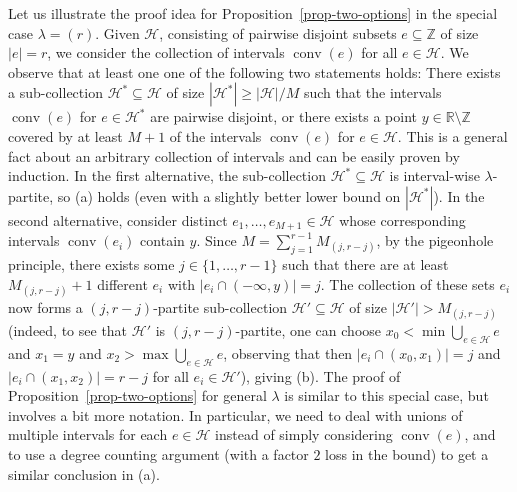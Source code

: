 \documentclass{aic}
\theoremstyle{definition}
\numberwithin{equation}{section}
\numberwithin{figure}{section}
\newcommand{\su}{\subseteq}
\newcommand{\Z}{\mathbb{Z}}
\newcommand{\HH}{\mathcal{H}}
\newcommand{\conv}{\operatorname{conv}}
\begin{document}
Let us illustrate the proof idea for Proposition~\ref{prop-two-options} in the special case $\lambda = (r)$. Given $\HH$, consisting of pairwise disjoint subsets $e\su \Z$ of size $|e|=r$, we consider the collection of intervals $\conv(e)$ for all $e \in \HH$. We observe that at least one one of the following two statements holds: There exists a sub-collection $\HH^*\su \HH$ of size $|\HH^*|\ge |\HH|/M$ such that the intervals $\conv(e)$ for $e\in \HH^*$ are pairwise disjoint, or there exists a point $y \in \mathbb R\setminus \Z$ covered by at least $M+1$ of the intervals $\conv(e)$ for $e\in \HH$. This is a general fact about an arbitrary collection of intervals and can be easily proven by induction. In the first alternative, the sub-collection $\HH^*\su \HH$ is interval-wise $\lambda$-partite, so (a) holds (even with a slightly better lower bound on $|\HH^*|$). In the second alternative, consider distinct $e_1, \ldots, e_{M+1}\in \HH$ whose corresponding intervals $\conv(e_i)$ contain $y$. Since $M = \sum_{j=1}^{r-1} M_{(j, r-j)}$, by the pigeonhole principle, there exists some $j \in \{1, \ldots, r-1\}$ such that there are at least $M_{(j, r-j)}+1$ different $e_i$ with $|e_i \cap (-\infty, y)| = j$. The collection of these sets $e_i$ now forms a $(j, r-j)$-partite sub-collection $\HH'\su \HH$ of size $|\HH'|>M_{(j, r-j)}$ (indeed, to see that $\HH'$ is $(j, r-j)$-partite, one can choose $x_0<\min \bigcup_{e\in \HH} e$ and $x_1=y$ and $x_2>\max \bigcup_{e\in \HH} e$, observing that then $|e_i \cap (x_0, x_1)| = j$ and $|e_i \cap (x_1, x_2)| = r-j$ for all $e_i\in \HH'$), giving (b). The proof of Proposition~\ref{prop-two-options} for general $\lambda$ is similar to this special case, but involves a bit more notation.  In particular, we need to deal with unions of multiple intervals for each $e\in \HH$ instead of simply considering $\conv(e)$, and to use a degree counting argument (with a factor $2$ loss in the bound) to get a similar conclusion in (a).
\end{document}

